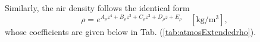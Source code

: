 \documentclass[11pt]{thesis}
\numberwithin{equation}{section}
\begin{document}
Similarly, the air density follows the identical form
\begin{equation}
\rho = e^{A_\rho z^4 + B_\rho z^3 + C_\rho z^2 + D_\rho z + E_\rho} \quad [\si{\kg/\m\cubed}],
\end{equation}
whose coefficients are given below in Tab. (\ref{tab:atmosExtendedrho}).
\end{document}
